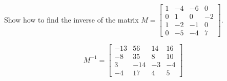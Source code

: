 
\begin{exerciseStatement}


Show how to find the inverse of the matrix \(M= \left[\begin{array}{cccc}
1 & -4 & -6 & 0 \\
0 & 1 & 0 & -2 \\
1 & -2 & -1 & 0 \\
0 & -5 & -4 & 7
\end{array}\right] \).


\end{exerciseStatement}
    
\begin{exerciseAnswer} 
\[M^{-1}= \left[\begin{array}{cccc}
-13 & 56 & 14 & 16 \\
-8 & 35 & 8 & 10 \\
3 & -14 & -3 & -4 \\
-4 & 17 & 4 & 5
\end{array}\right] \]
\end{exerciseAnswer}
    
